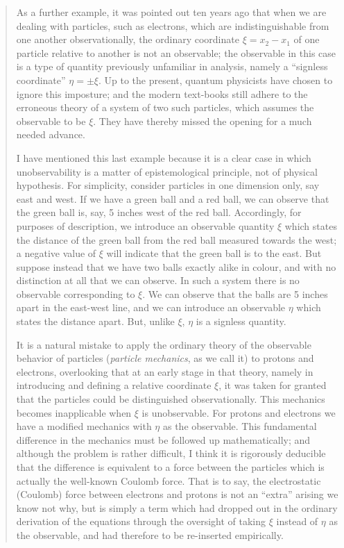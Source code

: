 \begin{quote}

    As a further example, it was pointed out ten years ago that when we are dealing with particles, such as electrons, which are indistinguishable from one another observationally, the ordinary coordinate $\xi = x_2 - x_1$ of one particle relative to another is not an observable; the observable in this case is a type of quantity previously unfamiliar in analysis, namely a ``signless coordinate'' $\eta = \pm \xi$.  Up to the present, quantum physicists have chosen to ignore this imposture; and the modern text-books still adhere to the erroneous theory of a system of two such particles, which assumes the observable to be $\xi$.  They have thereby missed the opening for a much needed advance.
    
    I have mentioned this last example because it is a clear case in which unobservability is a matter of epistemological principle, not of physical hypothesis.  For simplicity, consider particles in one dimension only, say east and west.  If we have a green ball and a red ball, we can observe that the green ball is, say, 5 inches west of the red ball.  Accordingly, for purposes of description, we introduce an observable quantity $\xi$ which states the distance of the green ball from the red ball measured towards the west; a negative value of $\xi$ will indicate that the green ball is to the east.  But suppose instead that we have two balls exactly alike in colour, and with no distinction at all that we can observe.  In such a system there is no observable corresponding to $\xi$.  We can observe that the balls are 5 inches apart in the east-west line, and we can introduce an observable $\eta$ which states the distance apart.  But, unlike $\xi$, $\eta$ is a signless quantity.
    
    It is a natural mistake to apply the ordinary theory of the observable behavior of particles (\emph{particle mechanics}, as we call it) to protons and electrons, overlooking that at an early stage in that theory, namely in introducing and defining a relative coordinate $\xi$, it was taken for granted that the particles could be distinguished observationally.  This mechanics becomes inapplicable when $\xi$ is unobservable.  For protons and electrons we have a modified mechanics with $\eta$ as the observable.  This fundamental difference in the mechanics must be followed up mathematically; and although the problem is rather difficult, I think it is rigorously deducible that the difference is equivalent to a force between the particles which is actually the well-known Coulomb force.  That is to say, the electrostatic (Coulomb) force between electrons and protons is not an ``extra'' arising we know not why, but is simply a term which had dropped out in the ordinary derivation of the equations through the oversight of taking $\xi$ instead of $\eta$ as the observable, and had therefore to be re-inserted empirically.
    

\end{quote}
